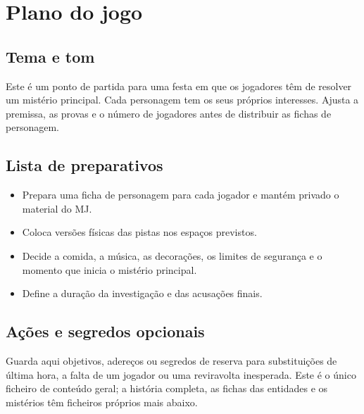 \section{Plano do jogo}

\subsection{Tema e tom}
Este é um ponto de partida para uma festa em que os jogadores têm de resolver um mistério principal. Cada personagem tem os seus próprios interesses. Ajusta a premissa, as provas e o número de jogadores antes de distribuir as fichas de personagem.

\subsection{Lista de preparativos}
\begin{itemize}
  \item Prepara uma ficha de personagem para cada jogador e mantém privado o material do MJ.
  \item Coloca versões físicas das pistas nos espaços previstos.
  \item Decide a comida, a música, as decorações, os limites de segurança e o momento que inicia o mistério principal.
  \item Define a duração da investigação e das acusações finais.
\end{itemize}

\subsection{Ações e segredos opcionais}
Guarda aqui objetivos, adereços ou segredos de reserva para substituições de última hora, a falta de um jogador ou uma reviravolta inesperada. Este é o único ficheiro de conteúdo geral; a história completa, as fichas das entidades e os mistérios têm ficheiros próprios mais abaixo.
